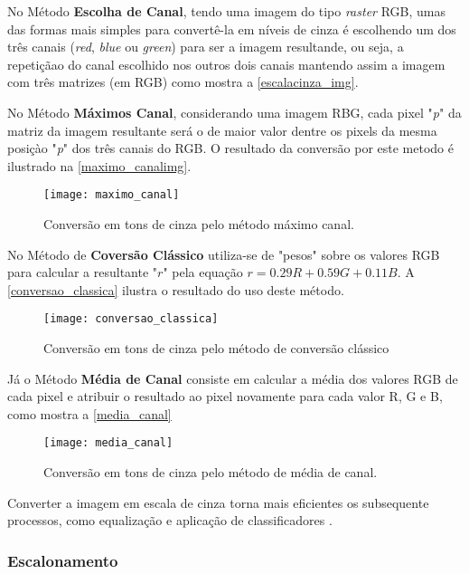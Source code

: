 No Método \textbf{Escolha de Canal}, tendo uma imagem do tipo \textit{raster} RGB, umas das formas mais simples para convertê-la em níveis de cinza é escolhendo um dos três canais (\textit{red}, \textit{blue} ou \textit{green}) para ser a imagem resultande, ou seja, a repetiçãao do canal escolhido nos outros dois canais mantendo assim a imagem com três matrizes (em RGB) como mostra a \autoref{escalacinza_img}.	


No Método \textbf{Máximos Canal}, considerando uma imagem RBG, cada pixel "\textit{p}" da matriz da imagem resultante será o de maior valor dentre os pixels da mesma posiçào "\textit{p}" dos três canais do RGB. O resultado da conversão por este metodo é ilustrado na \autoref{maximo_canalimg}.
\begin{figure}[h]
	\centering
	\texttt{[image: maximo\_canal]}
	\caption{Conversão em tons de cinza pelo método máximo canal.}
	\label{maximo_canalimg}
\end{figure}	

	
No Método de \textbf{Coversão Clássico} utiliza-se de "pesos" sobre os valores RGB para calcular a resultante "$r$" pela equação $r = 0.29R + 0.59G + 0.11B$. A \autoref{conversao_classica} ilustra o resultado do uso deste método. 
\begin{figure}[h]
	\centering
	\texttt{[image: conversao\_classica]}
	\caption{Conversão em tons de cinza pelo método de conversão clássico}
	\label{conversao_classica}
\end{figure}

Já o Método \textbf{Média de Canal} consiste em calcular a média dos valores RGB de cada pixel e atribuir o resultado ao pixel novamente para cada valor R, G e B, como mostra a \autoref{media_canal}
\begin{figure}[h]
	\centering
	\texttt{[image: media\_canal]}
	\caption{Conversão em tons de cinza pelo método de média de canal.}
	\label{media_canal}
\end{figure}

Converter a imagem em escala de cinza torna mais eficientes os subsequente processos, como equalização e aplicação de classificadores \cite{drmathew_java_programming}. 




\subsubsection{Escalonamento}\label{subsubsec:escalonamento}

